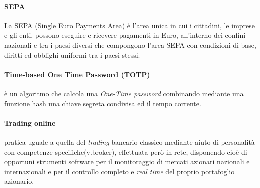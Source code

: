 \paragraph{SEPA}
	La SEPA (Single Euro Payments Area) è l’area unica in cui i cittadini, le imprese e gli enti, possono eseguire e ricevere pagamenti in Euro, all’interno dei confini nazionali e tra i paesi diversi che compongono l’area SEPA con condizioni di base, diritti ed obblighi uniformi tra i paesi stessi. 
\paragraph{Time-based One Time Password (TOTP)}
	è un algoritmo che calcola una \emph{One-Time password} combinando mediante una funzione hash una chiave segreta condivisa ed il tempo corrente. \cite{totprfc}
\paragraph{Trading online}
	pratica uguale a quella del \emph{trading} bancario classico mediante aiuto di personalità con competenze specifiche(v.broker), effettuata però in rete, disponendo cioè di opportuni strumenti software per il monitoraggio di mercati azionari nazionali e internazionali e  per il controllo completo e \emph{real time} del proprio portafoglio azionario.
